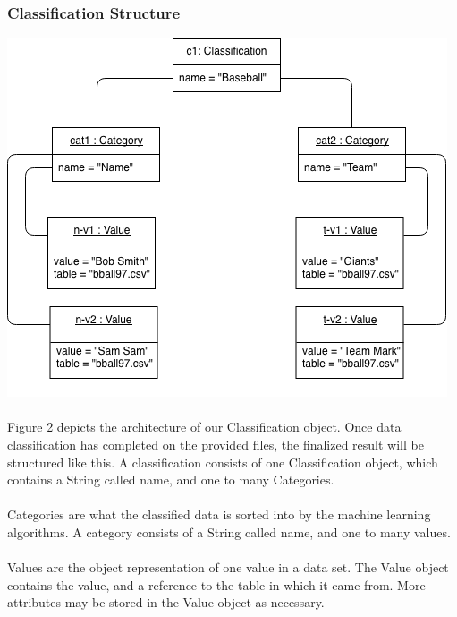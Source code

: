 \documentclass[12pt,oneside,letterpaper]{article}
\begin{document}
\subsubsection{Classification Structure}
\includegraphics[scale = 0.9]{spencer_object.png}
\begingroup
{}
\endgroup

\paragraph{} Figure 2 depicts the architecture of our Classification object. Once data classification has completed on the provided files, the finalized result will be structured like this. A classification consists of one Classification object, which contains a String called name, and one to many Categories. 
\paragraph{} Categories are what the classified data is sorted into by the machine learning algorithms. A category consists of a String called name, and one to many values.
\paragraph{} Values are the object representation of one value in a data set. The Value object contains the value, and a reference to the table in which it came from. More attributes may be stored in the Value object as necessary.
\end{document}
